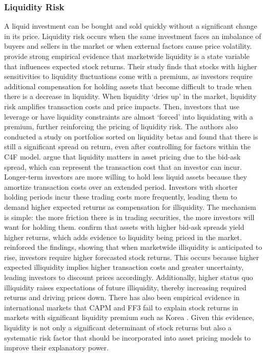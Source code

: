 
\subsubsection{Liquidity Risk}
A liquid investment can be bought and sold quickly without a significant change in its price. Liquidity risk occurs when the same investment faces an imbalance of buyers and sellers in the market or when external factors cause price volatility.  provide strong empirical evidence that marketwide liquidity is a state variable that influences expected stock returns. Their study finds that stocks with higher sensitivities to liquidity fluctuations come with a premium, as investors require additional compensation for holding assets that become difficult to trade when there is a decrease in liquidity. When liquidity `dries up' in the market, liquidity risk amplifies transaction costs and price impacts. Then, investors that use leverage or have liquidity constraints are almost `forced' into liquidating with a premium, further reinforcing the pricing of liquidity risk. The authors also conducted a study on portfolios sorted on liquidity betas and found that there is still a significant spread on return, even after controlling for factors within the C4F model.  argue that liquidity matters in asset pricing due to the bid-ask spread, which can represent the transaction cost that an investor can incur. Longer-term investors are more willing to hold less liquid assets because they amortize transaction costs over an extended period. Investors with shorter holding periods incur these trading costs more frequently, leading them to demand higher expected returns as compensation for illiquidity. The mechanism is simple: the more friction there is in trading securities, the more investors will want for holding them.  confirm that assets with higher bid-ask spreads yield higher returns, which adds evidence to liquidity being priced in the market.  reinforced the findings, showing that when marketwide illiquidity is anticipated to rise, investors require higher forecasted stock returns. This occurs because higher expected illiquidity implies higher transaction costs and greater uncertainty, leading investors to discount prices accordingly. Additionally, higher status quo illiquidity raises expectations of future illiquidity, thereby increasing required returns and driving prices down. There has also been empirical evidence in international markets that CAPM and FF3 fail to explain stock returns in markets with significant liquidity premium such as Korea \cite{jang_2012}. Given this evidence, liquidity is not only a significant determinant of stock returns but also a systematic risk factor that should be incorporated into asset pricing models to improve their explanatory power.



